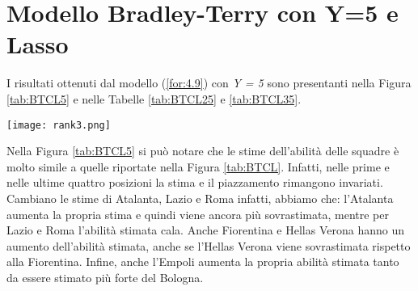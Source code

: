 \section{Modello Bradley-Terry con Y=5 e Lasso}
I risultati ottenuti dal modello (\ref{for:4.9}) con \emph{Y = 5} sono presentanti nella Figura \ref{tab:BTCL5} e nelle Tabelle \ref{tab:BTCL25} e \ref{tab:BTCL35}.
\begin{sidewaysfigure} 
	\centering
	\begin{center}
		\texttt{[image: rank3.png]}
		\caption{Barplot che indica per ogni squadra l'abilità stimata dal modello (\ref{for:4.9}) con \emph{Y = 5}. Viene indicato con un asterisco le squadre con un piazzamento stimato diverso da quello reale anche esso riportato a destra del grafico.} \label{tab:BTCL5} 
	\end{center}
\end{sidewaysfigure}
Nella Figura \ref{tab:BTCL5} si può notare che le stime dell'abilità delle squadre è molto simile a quelle riportate nella Figura \ref{tab:BTCL}. Infatti, nelle prime e nelle ultime quattro posizioni la stima e il piazzamento rimangono invariati. Cambiano le stime di Atalanta, Lazio e Roma infatti, abbiamo che: l'Atalanta aumenta la propria stima e quindi viene ancora più sovrastimata, mentre per Lazio e Roma l'abilità stimata cala. Anche Fiorentina e Hellas Verona hanno un aumento dell'abilità stimata, anche se l'Hellas Verona viene sovrastimata rispetto alla Fiorentina. Infine, anche l'Empoli aumenta la propria abilità stimata tanto da essere stimato più forte del Bologna.\\
